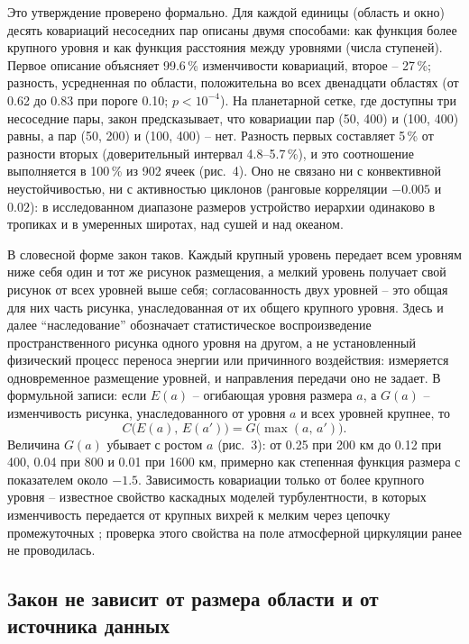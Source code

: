 \documentclass[12pt,a4paper]{article}
\begin{document}
Это утверждение проверено формально. Для каждой единицы (область и окно) десять ковариаций несоседних пар описаны двумя способами: как функция более крупного уровня и как функция расстояния между уровнями (числа ступеней). Первое описание объясняет 99.6\,\% изменчивости ковариаций, второе -- 27\,\%; разность, усредненная по области, положительна во всех двенадцати областях (от 0.62 до 0.83 при пороге 0.10; $p < 10^{-4}$). На планетарной сетке, где доступны три несоседние пары, закон предсказывает, что ковариации пар (50, 400) и (100, 400) равны, а пар (50, 200) и (100, 400) -- нет. Разность первых составляет 5\,\% от разности вторых (доверительный интервал 4.8--5.7\,\%), и это соотношение выполняется в 100\,\% из 902 ячеек (рис.~4). Оно не связано ни с конвективной неустойчивостью, ни с активностью циклонов (ранговые корреляции $-0.005$ и $0.02$): в исследованном диапазоне размеров устройство иерархии одинаково в тропиках и в умеренных широтах, над сушей и над океаном.

В словесной форме закон таков. Каждый крупный уровень передает всем уровням ниже себя один и тот же рисунок размещения, а мелкий уровень получает свой рисунок от всех уровней выше себя; согласованность двух уровней -- это общая для них часть рисунка, унаследованная от их общего крупного уровня. Здесь и далее “наследование” обозначает статистическое воспроизведение пространственного рисунка одного уровня на другом, а не установленный физический процесс переноса энергии или причинного воздействия: измеряется одновременное размещение уровней, и направления передачи оно не задает. В формульной записи: если $E(a)$ -- огибающая уровня размера $a$, а $G(a)$ -- изменчивость рисунка, унаследованного от уровня $a$ и всех уровней крупнее, то
\begin{equation}
C\bigl(E(a),\,E(a')\bigr) = G\bigl(\max(a,\,a')\bigr).
\label{eq:law}
\end{equation}
Величина $G(a)$ убывает с ростом $a$ (рис.~3): от 0.25 при 200 км до 0.12 при 400, 0.04 при 800 и 0.01 при 1600 км, примерно как степенная функция размера с показателем около $-1.5$. Зависимость ковариации только от более крупного уровня -- известное свойство каскадных моделей турбулентности, в которых изменчивость передается от крупных вихрей к мелким через цепочку промежуточных \cite{Arneodo1998,BacryMuzy2003,LovejoySchertzer2013}; проверка этого свойства на поле атмосферной циркуляции ранее не проводилась.

\subsection{Закон не зависит от размера области и от источника данных}
\end{document}
